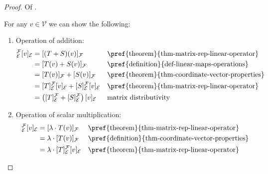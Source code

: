\begin{proof}
	Of .
	\begin{flushleft}
		For any $v\in\mathcal{V}$ we can show the following:
		\begin{enumerate}
			\item Operation of addition:
			      \begin{align*}
				      [T+S]_\mathcal{E}^\mathcal{F}[v]_\mathcal{E}
				       & = [(T+S)(v)]_\mathcal{F}                                                                  &  & \text{\pref{theorem}{thm-matrix-rep-linear-operator}}   \\
				       & = [T(v)+S(v)]_\mathcal{F}                                                                 &  & \text{\pref{definition}{def-linear-maps-operations}}    \\
				       & = [T(v)]_\mathcal{F} + [S(v)]_\mathcal{F}                                                 &  & \text{\pref{theorem}{thm-coordinate-vector-properties}} \\
				       & = [T]_\mathcal{E}^\mathcal{F}[v]_\mathcal{E} + [S]_\mathcal{E}^\mathcal{F}[v]_\mathcal{E} &  & \text{\pref{theorem}{thm-matrix-rep-linear-operator}}   \\
				       & = \left([T]_\mathcal{E}^\mathcal{F} + [S]_\mathcal{E}^\mathcal{F}\right) [v]_\mathcal{E}  &  & \text{matrix distributivity}                            \\
			      \end{align*}
			\item Operation of scalar multiplication:
			      \begin{align*}
				      [\lambda \cdot T]_\mathcal{E}^\mathcal{F}[v]_\mathcal{E}
				       & = [\lambda \cdot T(v)]_\mathcal{F}                         &  & \text{\pref{theorem}{thm-matrix-rep-linear-operator}}      \\
				       & = \lambda \cdot [T(v)]_\mathcal{F}                         &  & \text{\pref{definition}{thm-coordinate-vector-properties}} \\
				       & = \lambda \cdot [T]_\mathcal{E}^\mathcal{F}[v]_\mathcal{E} &  & \text{\pref{theorem}{thm-matrix-rep-linear-operator}}
			      \end{align*}
		\end{enumerate}
	\end{flushleft}
\end{proof}

